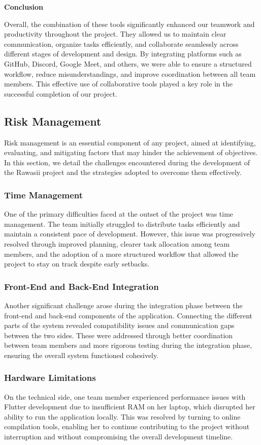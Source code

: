 \documentclass[12pt]{article}
\begin{document}
\vspace{1cm}

\textbf{Conclusion}

Overall, the combination of these tools significantly enhanced our teamwork and productivity throughout the project. They allowed us to maintain clear communication, organize tasks efficiently, and collaborate seamlessly across different stages of development and design. By integrating platforms such as GitHub, Discord, Google Meet, and others, we were able to ensure a structured workflow, reduce misunderstandings, and improve coordination between all team members. This effective use of collaborative tools played a key role in the successful completion of our project.
\subsection{Risk Management}
Risk management is an essential component of any project, aimed at identifying, evaluating, and mitigating factors that may hinder the achievement of objectives. In this section, we detail the challenges encountered during the development of the Rawasii project and the strategies adopted to overcome them effectively.
\subsubsection{Time Management}
One of the primary difficulties faced at the outset of the project was time management. The team initially struggled to distribute tasks efficiently and maintain a consistent pace of development. However, this issue was progressively resolved through improved planning, clearer task allocation among team members, and the adoption of a more structured workflow that allowed the project to stay on track despite early setbacks.
\subsubsection{Front-End and Back-End Integration}
Another significant challenge arose during the integration phase between the front-end and back-end components of the application. Connecting the different parts of the system revealed compatibility issues and communication gaps between the two sides. These were addressed through better coordination between team members and more rigorous testing during the integration phase, ensuring the overall system functioned cohesively.
\subsubsection{Hardware Limitations}
On the technical side, one team member experienced performance issues with Flutter development due to insufficient RAM on her laptop, which disrupted her ability to run the application locally. This was resolved by turning to online compilation tools, enabling her to continue contributing to the project without interruption and without compromising the overall development timeline.
\end{document}
